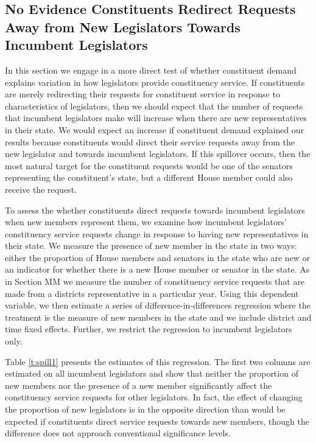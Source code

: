 \documentclass{article}
\begin{document}
\subsection{No Evidence Constituents Redirect Requests Away from New Legislators Towards Incumbent Legislators}
In this section we engage in a more direct test of whether constituent demand explains variation in how legislators provide constituency service.  If constituents are merely redirecting their requests for constituent service in response to characteristics of legislators, then we should expect that the number of requests that incumbent legislators make will increase when there are new representatives in their state.  We would expect an increase if constituent demand explained our results because constituents would direct their service requests away from the new legislator and towards incumbent legislators.  If this spillover occurs, then the most natural target for the constituent requests would be one of the senators representing the constituent's state, but a different House member could also receive the request.    

To assess the whether constituents direct requests towards incumbent legislators when new members represent them, we examine how incumbent legislators' constituency service requests change in response to having new representatives in their state.  We measure the presence of new member in the state in two ways: either the proportion of House members and senators in the state who are new or an indicator for whether there is a new House member or senator in the state.  As in Section MM we measure the number of constituency service requests that are made from a districts representative in a particular year.  Using this dependent variable, we then estimate a series of difference-in-differences regression where the treatment is the measure of new members in the state and we include district and time fixed effects.  Further, we restrict the regression to incumbent legislators only.    

Table \ref{t:spill1} presents the estimates of this regression.  The first two columns are estimated on all incumbent legislators and show that neither the proportion of new members nor the presence of a new member significantly affect the constituency service requests for other legislators.  In fact, the effect of changing the proportion of new legislators is in the opposite direction than would be expected if constituents direct service requests towards new members, though the difference does not approach conventional significance levels.   
    
\end{document}

